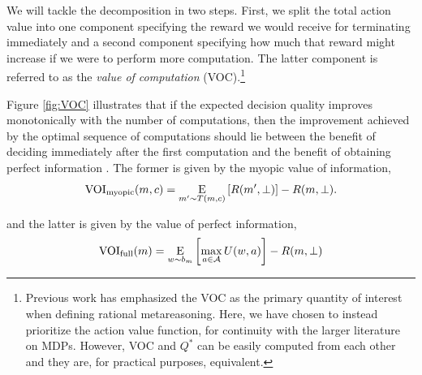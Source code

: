 We will tackle the decomposition in two steps. First, we split the total action value into one component specifying the reward we would receive for terminating immediately and a second component specifying how much that reward might increase if we were to perform more computation. The latter component is referred to as the \emph{value of computation} (VOC).\footnote{%
  Previous work has emphasized the VOC as the primary quantity of interest when defining rational metareasoning. Here, we have chosen to instead prioritize the action value function, for continuity with the larger literature on MDPs. However, VOC and $Q^*$ can be easily computed from each other and they are, for practical purposes, equivalent.
} 



Figure \ref{fig:VOC} illustrates that if the expected decision quality improves monotonically with the number of computations, then the improvement achieved by the optimal sequence of computations should lie between the benefit of deciding immediately after the first computation and the benefit of obtaining perfect information \cite{Howard1966}. The former is given by the myopic value of information,
%
\begin{equation*}
  \VOImy(m,c) = \expectunder{R(m', \bot)}{m' \sim T(m, c)} - R(m, \bot).
\end{equation*}

%
and the latter is given by the value of perfect information,
%
\begin{equation}
  \label{eq:vpi}
  \VPI(m) = \expectunder{\max_{a \in \A} U(w, a)}{w \sim b_m} - R(m, \bot)
\end{equation}

%


